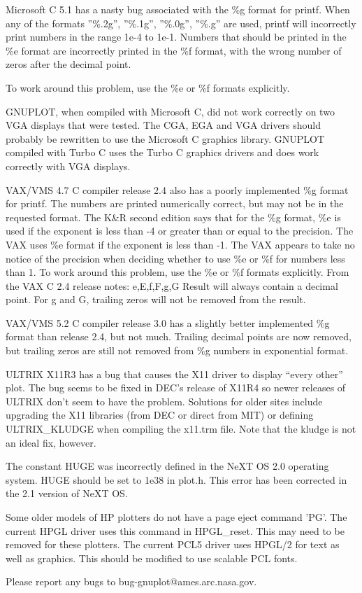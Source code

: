 Microsoft C 5.1 has a nasty bug associated with the \%g format for
printf. When any of the formats ''\%.2g'', ''\%.1g'', ''\%.0g'', ''\%.g'' are
used, printf will incorrectly print numbers in the range 1e-4 to 1e-1.
Numbers that should be printed in the \%e format are incorrectly 
printed in the \%f format, with the wrong number of zeros after the 
decimal point.

To work around this problem, use the \%e or \%f formats explicitly.

GNUPLOT, when compiled with Microsoft C, did not work correctly on two
VGA displays that were tested. The CGA, EGA and VGA drivers should 
probably be rewritten to use the Microsoft C graphics library.
GNUPLOT compiled with Turbo C uses the Turbo C graphics drivers and 
does work correctly with VGA displays.

VAX/VMS 4.7 C compiler release 2.4 also has a poorly implemented \%g 
format for printf. The numbers are printed numerically correct, but 
may not be in the requested format. The K\&R second edition says that 
for the \%g format, \%e is used if the exponent is less than -4 or greater 
than or equal to the precision. The VAX uses \%e format if the exponent 
is less than -1. The VAX appears to take no notice of the precision 
when deciding whether to use \%e or \%f for numbers less than 1.
To work around this problem, use the \%e or \%f formats explicitly.
From the VAX C 2.4 release notes:
e,E,f,F,g,G  Result will always contain a decimal  point.
For g and G, trailing zeros will not be removed from the result.

VAX/VMS 5.2 C compiler release 3.0 has a slightly better implemented
\%g format than release 2.4, but not much. Trailing decimal points are 
now removed, but trailing zeros are still not removed from \%g numbers 
in exponential format.

ULTRIX X11R3 has a bug that causes the X11 driver to display ``every
other'' plot.  The bug seems to be fixed in DEC's release of X11R4 so
newer releases of ULTRIX don't seem to have the problem.  Solutions for 
older sites include upgrading the X11 libraries (from DEC or direct from 
MIT) or defining ULTRIX\_KLUDGE when compiling the x11.trm file.  Note 
that the kludge is not an ideal fix, however.

The constant HUGE was incorrectly defined in the NeXT OS 2.0 operating
system.  HUGE should be set to 1e38 in plot.h. This error has been
corrected in the 2.1 version of NeXT OS.

Some older models of HP plotters do not have a page eject command 'PG'.
The current HPGL driver uses this command in HPGL\_reset.  This may need
to be removed for these plotters.  The current PCL5 driver uses HPGL/2
for text as well as graphics.  This should be modified to use scalable
PCL fonts.

Please report any bugs to bug-gnuplot@ames.arc.nasa.gov.

